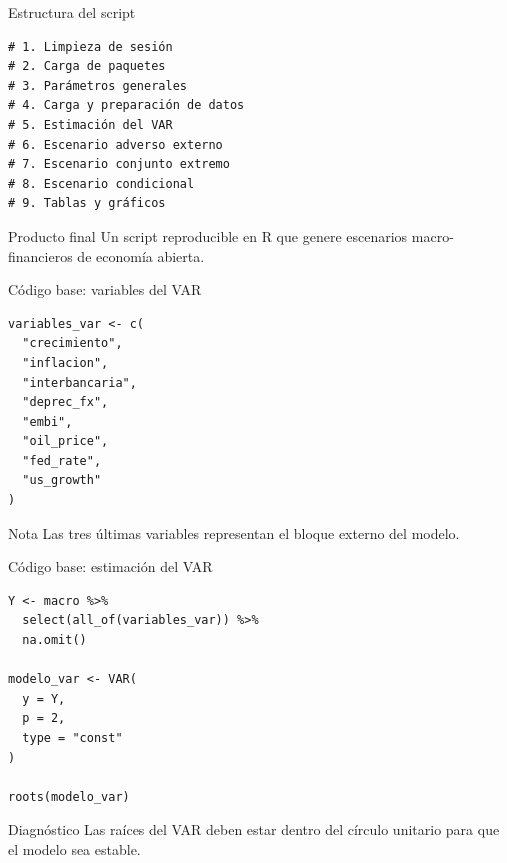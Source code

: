 \begin{frame}[fragile]{Estructura del script}

\small

\begin{verbatim}
# 1. Limpieza de sesión
# 2. Carga de paquetes
# 3. Parámetros generales
# 4. Carga y preparación de datos
# 5. Estimación del VAR
# 6. Escenario adverso externo
# 7. Escenario conjunto extremo
# 8. Escenario condicional
# 9. Tablas y gráficos
\end{verbatim}

\begin{block}{Producto final}
Un script reproducible en R que genere escenarios macro-financieros de economía abierta.
\end{block}

\end{frame}

\begin{frame}[fragile]{Código base: variables del VAR}

\small

\begin{verbatim}
variables_var <- c(
  "crecimiento",
  "inflacion",
  "interbancaria",
  "deprec_fx",
  "embi",
  "oil_price",
  "fed_rate",
  "us_growth"
)
\end{verbatim}

\begin{alertblock}{Nota}
Las tres últimas variables representan el bloque externo del modelo.
\end{alertblock}

\end{frame}

\begin{frame}[fragile]{Código base: estimación del VAR}

\small

\begin{verbatim}
Y <- macro %>%
  select(all_of(variables_var)) %>%
  na.omit()

modelo_var <- VAR(
  y = Y,
  p = 2,
  type = "const"
)

roots(modelo_var)
\end{verbatim}

\begin{block}{Diagnóstico}
Las raíces del VAR deben estar dentro del círculo unitario para que el modelo sea estable.
\end{block}

\end{frame}

